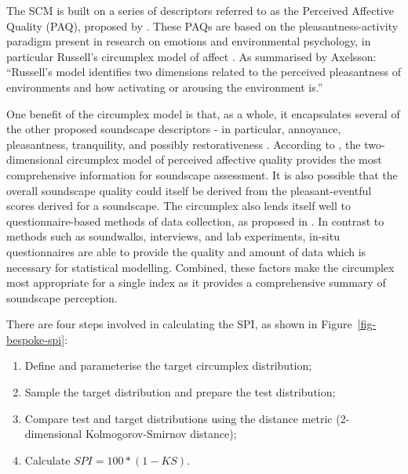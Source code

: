 \documentclass[
  authoryear,
  preprint,
  3p]{elsarticle}
\providecommand{\tightlist}{%
  \setlength{\itemsep}{0pt}\setlength{\parskip}{0pt}}\usepackage{longtable,booktabs,array}
\begin{document}
The SCM is built on a series of descriptors referred to as the Perceived
Affective Quality (PAQ), proposed by \citep{Axelsson2010principal}.
These PAQs are based on the pleasantness-activity paradigm present in
research on emotions and environmental psychology, in particular
Russell's circumplex model of affect \citep{Russell1980circumplex}. As
summarised by Axelsson: ``Russell's model identifies two dimensions
related to the perceived pleasantness of environments and how activating
or arousing the environment is.''

One benefit of the circumplex model is that, as a whole, it encapsulates
several of the other proposed soundscape descriptors - in particular,
annoyance, pleasantness, tranquility, and possibly restorativeness
\citep{Aletta2016Soundscape}. According to \citet{Axelsson2015How}, the
two-dimensional circumplex model of perceived affective quality provides
the most comprehensive information for soundscape assessment. It is also
possible that the overall soundscape quality could itself be derived
from the pleasant-eventful scores derived for a soundscape. The
circumplex also lends itself well to questionnaire-based methods of data
collection, as proposed in \citet{ISO12913Part2}. In contrast to methods
such as soundwalks, interviews, and lab experiments, in-situ
questionnaires are able to provide the quality and amount of data which
is necessary for statistical modelling. Combined, these factors make the
circumplex most appropriate for a single index as it provides a
comprehensive summary of soundscape perception.

There are four steps involved in calculating the SPI, as shown in
Figure~\ref{fig-bespoke-spi}:

\begin{enumerate}
\def\labelenumi{\arabic{enumi}.}
\tightlist
\item
  Define and parameterise the target circumplex distribution;
\item
  Sample the target distribution and prepare the test distribution;
\item
  Compare test and target distributions using the distance metric
  (2-dimensional Kolmogorov-Smirnov distance);
\item
  Calculate \(SPI = 100 * (1 - KS)\).
\end{enumerate}
\end{document}
